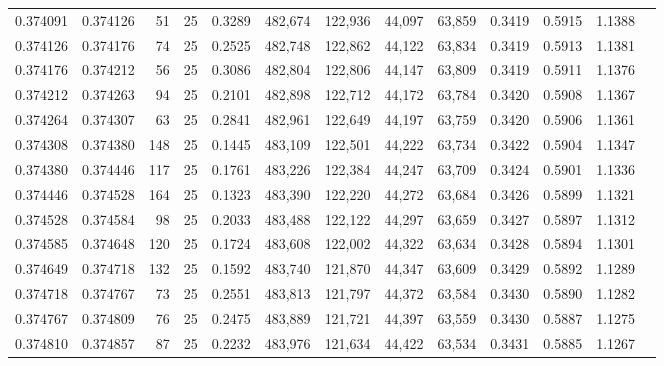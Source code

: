\begin{tabular}{rrrrrrrrrrrrr}
0.374091 & 0.374126 &    51 &  25 &                                     0.3289 & 482,674 & 122,936 &  44,097 &  63,859 & 0.3419 & 0.5915 & 1.1388 \\
0.374126 & 0.374176 &    74 &  25 &                                     0.2525 & 482,748 & 122,862 &  44,122 &  63,834 & 0.3419 & 0.5913 & 1.1381 \\
0.374176 & 0.374212 &    56 &  25 &                                     0.3086 & 482,804 & 122,806 &  44,147 &  63,809 & 0.3419 & 0.5911 & 1.1376 \\
0.374212 & 0.374263 &    94 &  25 &                                     0.2101 & 482,898 & 122,712 &  44,172 &  63,784 & 0.3420 & 0.5908 & 1.1367 \\
0.374264 & 0.374307 &    63 &  25 &                                     0.2841 & 482,961 & 122,649 &  44,197 &  63,759 & 0.3420 & 0.5906 & 1.1361 \\
0.374308 & 0.374380 &   148 &  25 &                                     0.1445 & 483,109 & 122,501 &  44,222 &  63,734 & 0.3422 & 0.5904 & 1.1347 \\
0.374380 & 0.374446 &   117 &  25 &                                     0.1761 & 483,226 & 122,384 &  44,247 &  63,709 & 0.3424 & 0.5901 & 1.1336 \\
0.374446 & 0.374528 &   164 &  25 &                                     0.1323 & 483,390 & 122,220 &  44,272 &  63,684 & 0.3426 & 0.5899 & 1.1321 \\
0.374528 & 0.374584 &    98 &  25 &                                     0.2033 & 483,488 & 122,122 &  44,297 &  63,659 & 0.3427 & 0.5897 & 1.1312 \\
0.374585 & 0.374648 &   120 &  25 &                                     0.1724 & 483,608 & 122,002 &  44,322 &  63,634 & 0.3428 & 0.5894 & 1.1301 \\
0.374649 & 0.374718 &   132 &  25 &                                     0.1592 & 483,740 & 121,870 &  44,347 &  63,609 & 0.3429 & 0.5892 & 1.1289 \\
0.374718 & 0.374767 &    73 &  25 &                                     0.2551 & 483,813 & 121,797 &  44,372 &  63,584 & 0.3430 & 0.5890 & 1.1282 \\
0.374767 & 0.374809 &    76 &  25 &                                     0.2475 & 483,889 & 121,721 &  44,397 &  63,559 & 0.3430 & 0.5887 & 1.1275 \\
0.374810 & 0.374857 &    87 &  25 &                                     0.2232 & 483,976 & 121,634 &  44,422 &  63,534 & 0.3431 & 0.5885 & 1.1267 \\

\end{tabular}
